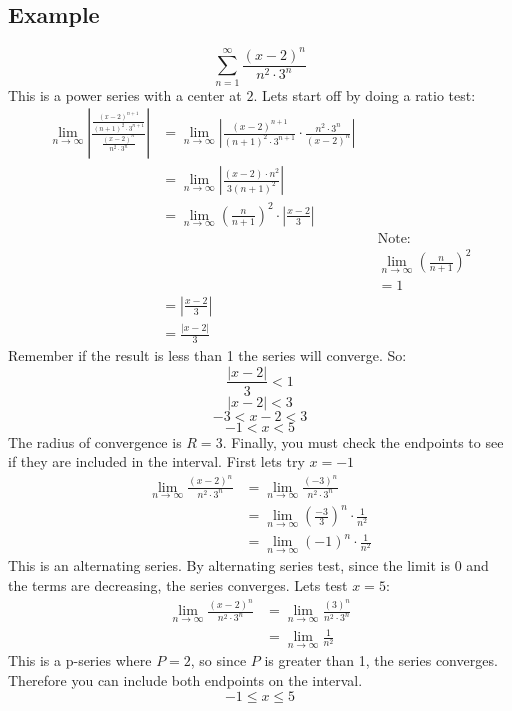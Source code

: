 \documentclass{report}
\begin{document}
    \subsection{Example}
        \[\sum_{n = 1}^{\infty} \frac{(x-2)^n}{n^2 \cdot 3^n} \]
        This is a power series with a center at \(2\).
        Lets start off by doing a ratio test:
        \begin{align*}
            \lim_{n \to \infty} \left| \frac{\frac{(x-2)^{n+1}}{(n+1)^2 \cdot 3^{n+1}}}{\frac{(x-2)^n}{n^2 \cdot 3^n}} \right|
            &= \lim_{n \to \infty} \left| \frac{(x-2)^{n+1}}{(n+1)^2 \cdot 3^{n+1}} \cdot \frac{n^2 \cdot 3^n}{(x-2)^n} \right| \\
            &= \lim_{n \to \infty} \left| \frac{(x-2) \cdot n^2}{3(n+1)^2} \right| \\
            &= \lim_{n \to \infty} \left( \frac{n}{n+1}\right)^2 \cdot \left| \frac{x-2}{3} \right| \\
            && &\text{Note:} \\
            && & \lim_{n \to \infty} \left( \frac{n}{n+1} \right)^2 \\
            && &=1 \\
            &= \left| \frac{x-2}{3}\right| \\
            &= \frac{|x-2|}{3}
        \end{align*}
        Remember if the result is less than 1 the series will converge.
        So:
        \[\frac{|x-2|}{3} < 1\]
        \[|x-2| < 3\]
        \[-3 < x-2 < 3\]
        \[-1 < x < 5\]
        The radius of convergence is \(R = 3\).
        Finally, you must check the endpoints to see if they are included in the interval.
        First lets try \(x = -1\)
        \begin{align*}
            \lim_{n \to \infty} \frac{(x-2)^n}{n^2 \cdot 3^n}
            &= \lim_{n \to \infty}  \frac{(-3)^n}{n^2 \cdot 3^n} \\
            &= \lim_{n \to \infty} \left(\frac{-3}{3}\right)^n \cdot \frac{1}{n^2} \\
            &=\lim_{n \to \infty} (-1)^n \cdot \frac{1}{n^2}
        \end{align*}
        This is an alternating series.
        By alternating series test, since the limit is 0 and the terms are decreasing, the series converges.
        Lets test \(x = 5\):
        \begin{align*}
            \lim_{n \to \infty} \frac{(x-2)^n}{n^2 \cdot 3^n}
            &= \lim_{n \to \infty}  \frac{(3)^n}{n^2 \cdot 3^n} \\
            &= \lim_{n \to \infty} \frac{1}{n^2}
        \end{align*}
        This is a p-series where \(P = 2\), so since \(P\) is greater than 1, the series converges.
        Therefore you can include both endpoints on the interval.
        \[-1 \leq x \leq 5\]
    
\end{document}
